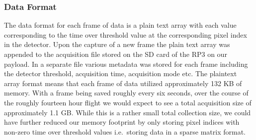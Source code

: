 {\subsubsection{Data Format}
The data format for each frame of data is a plain text array with each value corresponding to the time over threshold value at the corresponding pixel index in the detector. Upon the capture of a new frame the plain text array was appended to the acquisition file stored on the SD card of the RP3 on our payload. In a separate file various metadata was stored for each frame including the detector threshold, acquisition time, acquisition mode etc. The plaintext array format means that each frame of data utilized approximately 132 KB of memory. With a frame being saved roughly every six seconds, over the course of the roughly fourteen hour flight we would expect to see a total acquisition size of approximately 1.1 GB. While this is a rather small total collection size, we could have further reduced our memory footprint by only storing pixel indices with non-zero time over threshold values i.e.\ storing data in a sparse matrix format. 

}
